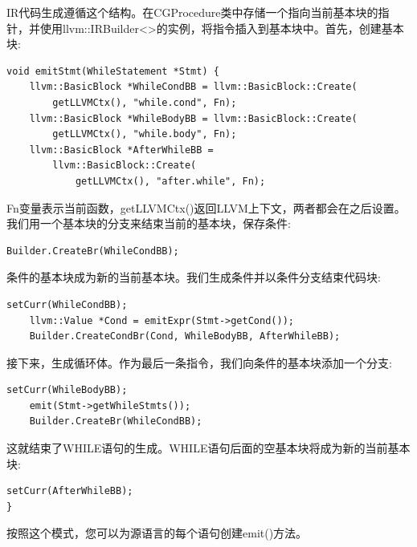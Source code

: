 IR代码生成遵循这个结构。在CGProcedure类中存储一个指向当前基本块的指针，并使用llvm::IRBuilder<>的实例，将指令插入到基本块中。首先，创建基本块:\par

\begin{lstlisting}[caption={}]
void emitStmt(WhileStatement *Stmt) {
	llvm::BasicBlock *WhileCondBB = llvm::BasicBlock::Create(
		getLLVMCtx(), "while.cond", Fn);
	llvm::BasicBlock *WhileBodyBB = llvm::BasicBlock::Create(
		getLLVMCtx(), "while.body", Fn);
	llvm::BasicBlock *AfterWhileBB =
		llvm::BasicBlock::Create(
			getLLVMCtx(), "after.while", Fn);
\end{lstlisting}

Fn变量表示当前函数，getLLVMCtx()返回LLVM上下文，两者都会在之后设置。我们用一个基本块的分支来结束当前的基本块，保存条件:\par

\begin{lstlisting}[caption={}]
	Builder.CreateBr(WhileCondBB);
\end{lstlisting}

条件的基本块成为新的当前基本块。我们生成条件并以条件分支结束代码块:\par

\begin{lstlisting}[caption={}]
	setCurr(WhileCondBB);
	llvm::Value *Cond = emitExpr(Stmt->getCond());
	Builder.CreateCondBr(Cond, WhileBodyBB, AfterWhileBB);
\end{lstlisting}

接下来，生成循环体。作为最后一条指令，我们向条件的基本块添加一个分支:\par

\begin{lstlisting}[caption={}]
	setCurr(WhileBodyBB);
	emit(Stmt->getWhileStmts());
	Builder.CreateBr(WhileCondBB);
\end{lstlisting}

这就结束了WHILE语句的生成。WHILE语句后面的空基本块将成为新的当前基本块:\par

\begin{lstlisting}[caption={}]
	setCurr(AfterWhileBB);
}
\end{lstlisting}

按照这个模式，您可以为源语言的每个语句创建emit()方法。\par





















